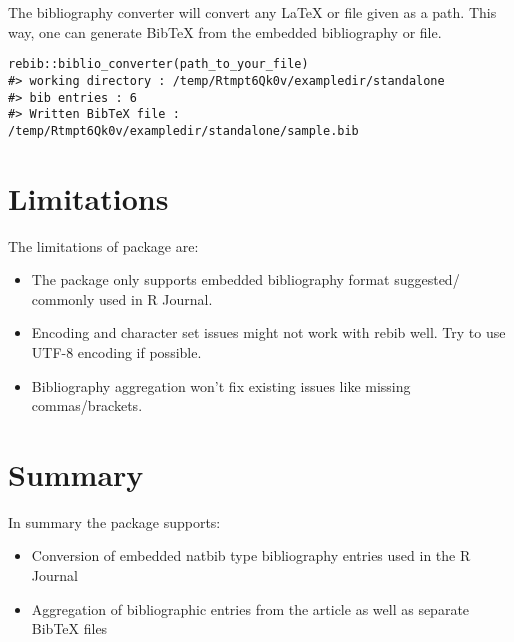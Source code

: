 The bibliography converter will convert any LaTeX or  file given as a path. This way, one can generate BibTeX from the embedded bibliography or  file.
\begin{verbatim}
rebib::biblio_converter(path_to_your_file)
#> working directory : /temp/Rtmpt6Qk0v/exampledir/standalone
#> bib entries : 6
#> Written BibTeX file : /temp/Rtmpt6Qk0v/exampledir/standalone/sample.bib
\end{verbatim}

\section{Limitations}
The limitations of  package are:
\begin{itemize}
\item The  package only supports embedded bibliography format suggested/ commonly
used in R Journal.
\item Encoding and character set issues might not work with rebib well. Try to use UTF-8 encoding 
if possible.
\item Bibliography aggregation won't fix existing issues like missing commas/brackets.
\end{itemize}
\section{Summary}

In summary the  package supports:
\begin{itemize}
\item Conversion of embedded natbib type bibliography entries used in the R Journal
\item Aggregation of bibliographic entries from the article as well as separate BibTeX files
\end{itemize}


\address{%
Abhishek Ulayil\\
Student, Institute of Actuaries of India\\%
Mumbai, India\\
ORCiD: 0009-0000-6935-8690\\
}
